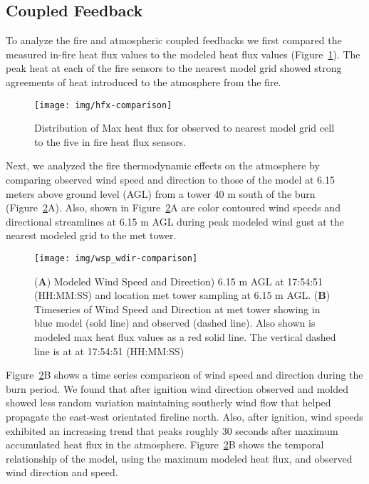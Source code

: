 \documentclass[preprints,article,accept,moreauthors,pdftex]{Definitions/mdpi}
\begin{document}
\subsection{Coupled Feedback}

To analyze the fire and atmospheric coupled feedbacks we first compared the measured in-fire heat flux values to the modeled heat flux values (Figure~\ref{fig6}). The peak heat at each of the fire sensors to the nearest model grid showed strong agreements of heat introduced to the atmosphere from the fire.

\begin{figure}[H]
\centering
 \texttt{[image: img/hfx-comparison]}
 \caption{Distribution of Max heat flux for observed to nearest model grid cell to the five in fire heat flux sensors.\label{fig6}}
 \end{figure}

Next, we analyzed the fire thermodynamic effects on the atmosphere by comparing observed wind speed and direction to those of the model at 6.15 meters above ground level (AGL) from a tower 40 m south of the burn (Figure~\ref{fig7}A). Also, shown in Figure~\ref{fig7}A are color contoured wind speeds and directional streamlines at 6.15 m AGL during peak modeled wind gust at the nearest modeled grid to the met tower.

\begin{figure}[H]
\centering
 \texttt{[image: img/wsp\_wdir-comparison]}
 \caption{(\textbf{A}) Modeled Wind Speed and Direction) 6.15 m AGL at 17:54:51 (HH:MM:SS) and location met tower sampling at 6.15 m AGL. (\textbf{B}) Timeseries of Wind Speed and Direction at met tower showing in blue model (sold line) and observed (dashed line). Also shown is modeled max heat flux values as a red solid line. The vertical dashed line is at at 17:54:51 (HH:MM:SS)\label{fig7}}
 \end{figure}

Figure~\ref{fig7}B shows a time series comparison of wind speed and direction during the burn period. We found that after ignition wind direction observed and molded showed less random variation maintaining southerly wind flow that helped propagate the east-west orientated fireline north. Also, after ignition, wind speeds exhibited an increasing trend that peaks roughly 30 seconds after maximum accumulated heat flux in the atmosphere. Figure~\ref{fig7}B shows the temporal relationship of the model, using the maximum modeled heat flux, and observed wind direction and speed.
\end{document}
